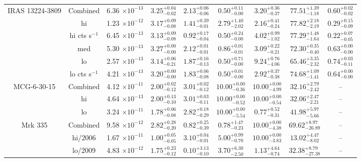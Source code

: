 \documentclass{article}
\begin{document}
\begin{landscape}
\begin{longtable}{ccccccccc}
IRAS 13224-3809 & Combined & 6.36 $\times 10^{-13}$ & $3.25^{+0.04}_{-0.02}$ &  $2.13^{+0.06}_{-0.06}$ & $0.50^{+0.11}_{-0.00}$ & $3.20^{+0.36}_{-0.37}$ & $77.51^{+1.39}_{-1.18}$ & $0.60^{+0.02}_{-0.02}$ \\ 
& hi & 1.23 $\times 10^{-12}$ &  $3.17^{+0.09}_{-0.08}$ &  $1.41^{+0.39}_{-0.01}$ & $2.79^{+1.40}_{-2.02}$ & $2.16^{+0.41}_{-0.24}$ & $77.82^{+2.18}_{-2.19}$ & $0.29^{+0.15}_{-0.09}$ \\ 
& hi cts s$^{-1}$ & 6.45 $\times 10^{-13}$ &  $3.13^{+0.09}_{-0.08}$ &  $0.92^{+0.17}_{-0.04}$ & $0.50^{+0.24}_{-0.00}$ & $4.02^{+0.99}_{-1.02}$ & $77.29^{+1.48}_{-1.64}$ & $0.22^{+0.07}_{-0.05}$ \\ 
& med & 5.30 $\times 10^{-13}$ &  $3.27^{+0.00}_{-0.00}$ & $2.12^{+0.01}_{-0.01}$ & $0.86^{+0.01}_{-0.01}$ & $3.09^{+0.22}_{-0.21}$ & $72.30^{+0.35}_{-0.40}$ & $0.63^{+0.00}_{-0.00}$ \\ 
& lo & 2.57 $\times 10^{-13}$ &  $3.14^{+0.06}_{-0.21}$ & $1.87^{+0.16}_{-0.13}$ & $0.50^{+0.71}_{-0.00}$ & $9.24^{+0.76}_{-4.06}$ & $65.46^{+3.35}_{-2.32}$ & $0.74^{+0.03}_{-0.11}$ \\
& lo cts s$^{-1}$ & 4.21 $\times 10^{-13}$ &  $3.20^{+0.00}_{-0.00}$ &  $1.83^{+0.06}_{-0.08}$ & $0.50^{+0.01}_{-0.00}$ & $2.92^{+0.37}_{-0.38}$ & $74.68^{+1.09}_{-1.41}$ & $0.64^{+0.00}_{-0.00}$ \\ \hline 


MCG-6-30-15 & Combined & 4.12 $\times 10^{-11}$  & $2.00^{+0.02}_{-0.12}$ & $3.01^{+0.02}_{-0.12}$ & $10.00^{+0.00}_{-0.36}$ & $10.00^{+0.00}_{-4.99}$ & $32.16^{+2.79}_{-2.42}$ & --\\ 
& hi & 4.64 $\times 10^{-13}$ & $2.00^{+0.13}_{-0.10}$ & $3.01^{+0.03}_{-0.11}$ & $10.00^{+0.00}_{-0.52}$ & $10.00^{+0.00}_{-0.54}$ & $32.06^{+2.47}_{-2.21}$ & --\\
& lo & 3.24 $\times 10^{-11}$ & $1.78^{+0.06}_{-0.08}$ & $2.82^{+0.18}_{-0.29}$ & $10.00^{+0.00}_{-5.54}$ & $0.77^{+0.52}_{-0.31}$ & $41.98^{+5.97}_{-5.66}$ & --\\  \hline 

Mrk 335 & Combined  & 9.58 $\times 10^{-12}$ & $2.82^{+0.28}_{-0.20}$ & $0.82^{+0.25}_{-0.39}$ & $0.78^{+1.47}_{-0.23}$ & $10.00^{+0.00}_{-4.38}$ & $69.62^{+8.97}_{-26.89}$	& --\\
& hi/2006  & 1.67 $\times 10^{-11}$ & $1.00^{+0.05}_{-0.05}$ & $3.10^{+0.04}_{-0.01}$ & $5.00^{+0.99}_{-0.70}$ & $10.00^{+0.00}_{-3.83}$ & $13.02^{+4.47}_{-8.02}$ & --\\ 
& lo/2009  & 4.83 $\times 10^{-12}$ & $1.75^{+0.23}_{-0.12}$ &  $0.10^{+3.13}_{-0.10}$ & $3.70^{+6.30}_{-2.50}$ & $1.13^{+4.64}_{-0.74}$ & $32.38^{+8.79}_{-27.38}$ & --\\  \hline


\end{longtable}
\end{landscape}
\end{document}
